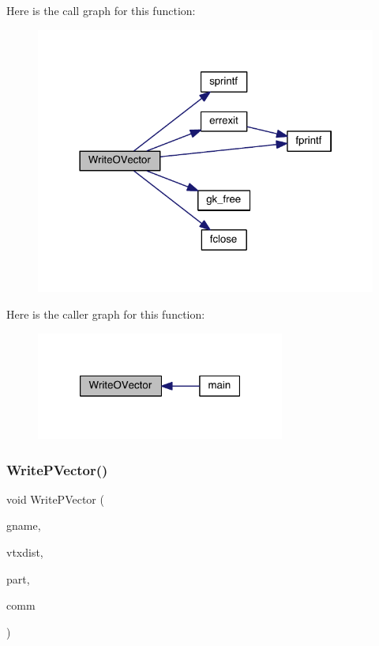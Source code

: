 Here is the call graph for this function\+:\nopagebreak
\begin{figure}[H]
\begin{center}
\leavevmode
\includegraphics[width=322pt]{a00954_a9ff4864d8e906761bd6c55597c085e3b_cgraph}
\end{center}
\end{figure}
Here is the caller graph for this function\+:\nopagebreak
\begin{figure}[H]
\begin{center}
\leavevmode
\includegraphics[width=232pt]{a00954_a9ff4864d8e906761bd6c55597c085e3b_icgraph}
\end{center}
\end{figure}
\mbox{\label{a00954_a19b5376612558b2381990f2e7a06bffc}} 
\subsubsection{\texorpdfstring{Write\+P\+Vector()}{WritePVector()}}
{\footnotesize\ttfamily void Write\+P\+Vector (\begin{DoxyParamCaption}\item[{char $\ast$}]{gname,  }\item[{\hyperlink{a00876_aaa5262be3e700770163401acb0150f52}{idx\+\_\+t} $\ast$}]{vtxdist,  }\item[{\hyperlink{a00876_aaa5262be3e700770163401acb0150f52}{idx\+\_\+t} $\ast$}]{part,  }\item[{M\+P\+I\+\_\+\+Comm}]{comm }\end{DoxyParamCaption})}

